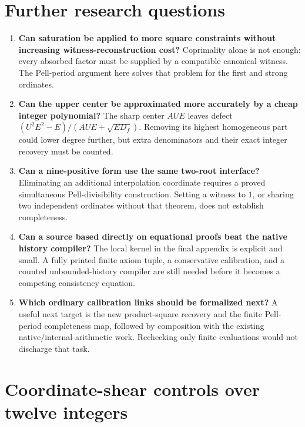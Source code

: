 \documentclass[11pt,letterpaper]{article}
\theoremstyle{remark}\newtheorem{remark}[theorem]{Remark}
\begin{document}
\section{Further research questions}

\begin{enumerate}
\item \textbf{Can saturation be applied to more square constraints without
      increasing witness-reconstruction cost?}  Coprimality alone is not
      enough: every absorbed factor must be supplied by a compatible
      canonical witness.  The Pell-period argument here solves that
      problem for the first and strong ordinates.
\item \textbf{Can the upper center be approximated more accurately by a
      cheap integer polynomial?}  The sharp center $AUE$ leaves defect
      $(U^2E^2-E)/(AUE+\sqrt{ED_f})$.  Removing its highest homogeneous
      part could lower degree further, but extra denominators and their
      exact integer recovery must be counted.
\item \textbf{Can a nine-positive form use the same two-root interface?}
      Eliminating an additional interpolation coordinate requires a
      proved simultaneous Pell-divisibility construction.  Setting a
      witness to $1$, or sharing two independent ordinates without that
      theorem, does not establish completeness.
\item \textbf{Can a source based directly on equational proofs beat the
      native history compiler?}  The local kernel in the final appendix
      is explicit and small.  A fully printed finite axiom tuple, a
      conservative calibration, and a counted unbounded-history compiler
      are still needed before it becomes a competing consistency equation.
\item \textbf{Which ordinary calibration links should be formalized next?}
      A useful next target is the new product-square recovery and the
      finite Pell-period completeness map, followed by composition with
      the existing native/internal-arithmetic work.  Rechecking only
      finite evaluations would not discharge that task.
\end{enumerate}

\appendix

\section{Coordinate-shear controls over twelve integers}
\label{sec:integer12-main}
\end{document}

